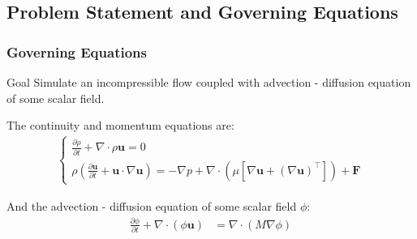 \documentclass[10pt,handout]{beamer}
\newcommand{\pr}[1]{\frac{\partial}{\partial #1}}
\begin{document}
\subsection{Problem Statement and Governing Equations} 
\begin{frame}\frametitle{Governing Equations} 
{}
\begin{exampleblock}{Goal}
Simulate an incompressible flow \newline coupled with advection - diffusion equation of some scalar field. \newline
\end{exampleblock}
  
The continuity and momentum equations are:
\begin{eqnarray}  
\left\{
	\begin{array}{ll}
\frac{\partial \rho}{\partial t} + \nabla \cdot \rho \textbf{u} = 0 \\
\rho\left( \frac{\partial \textbf{u} }{\partial t} + \textbf{u} \cdot \nabla \textbf{u}\right) = -\nabla p + \nabla \cdot (\mu[ \nabla \textbf{u} + (\nabla \textbf{u})^\top]) + \textbf{F}
	\end{array}\nonumber 
\right.
\end{eqnarray}

And the advection - diffusion equation of some scalar field $\phi$: 
\begin{align*}
\frac{\partial \phi}{\partial t} + \nabla \cdot (\phi \boldsymbol{u} ) &= \nabla \cdot (M \nabla \phi) %
\end{align*}

\end{frame}
\end{document}
